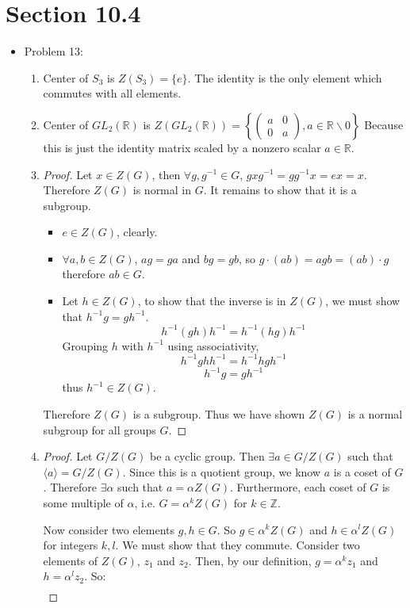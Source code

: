 \documentclass[a4paper,12pt]{extarticle}
\theoremstyle{definition}
\newcommand{\R}{\mathbb{R}} \newcommand{\Q}{\mathbb{Q}} \newcommand{\Z}{\mathbb{Z}} \newcommand{\N}{\mathbb{N}} \newcommand{\myskip}{\par\null\par} \renewcommand\qedsymbol{QED} \renewcommand{\leq}{\leqslant}\renewcommand{\geq}{\geqslant}
\begin{document}
\section{Section 10.4}
\begin{itemize}
    \item Problem 13:
    \begin{enumerate}[label=(\alph*)]
        \item Center of $S_3$ is $Z(S_3)=\{e\}$. The identity is the only element which commutes with all elements.
        \item Center of $GL_2(\R)$ is $Z(GL_2(\R))=\left\{\begin{pmatrix}
            a & 0 \\
            0 & a 
        \end{pmatrix},a\in\R\backslash 0\right\}$ Because this is just the identity matrix scaled by a nonzero scalar $a\in\R$.
        \item \begin{proof}
        Let $x\in Z(G)$, then $\forall g,g^{-1}\in G$, $gxg^{-1}=gg^{-1}x=ex=x$. Therefore $Z(G)$ is normal in $G$. It remains to show that it is a subgroup.\begin{itemize}
            \item $e\in Z(G)$, clearly.
            \item $\forall a,b\in Z(G)$, $ag=ga$ and $bg=gb$, so $g\cdot(ab)=agb=(ab)\cdot g$ therefore $ab\in G$.
            \item Let $h\in Z(G)$, to show that the inverse is in $Z(G)$, we must show that $h^{-1}g=gh^{-1}$. $$h^{-1}(gh)h^{-1}=h^{-1}(hg)h^{-1}$$ Grouping $h$ with $h^{-1}$ using associativity, $$h^{-1}ghh^{-1}=h^{-1}hgh^{-1}$$ $$h^{-1}g=gh^{-1}$$ thus $h^{-1}\in Z(G)$.
        \end{itemize} Therefore $Z(G)$ is a subgroup. Thus we have shown $Z(G)$ is a normal subgroup for all groups $G$.
        \end{proof}
        \item \begin{proof}
        Let $G\slash Z(G)$ be a cyclic group. Then $\exists a\in G\slash Z(G)$ such that $\langle a \rangle=G\slash Z(G)$. Since this is a quotient group, we know $a$ is a coset of $G$. Therefore $\exists \alpha$ such that $a=\alpha Z(G)$. Furthermore, each coset of $G$ is some multiple of $\alpha$, i.e. $G=\alpha^k Z(G)$ for $k\in\Z$.\myskip Now consider two elements $g,h\in G$. So $g\in\alpha^kZ(G)$ and $h\in\alpha^lZ(G)$ for integers $k,l$. We must show that they commute. Consider two elements of $Z(G)$, $z_1$ and $z_2$. Then, by our definition, $g=\alpha^kz_1$ and $h=\alpha^lz_2$. So:\begin{align*}

\end{align*}
\end{proof}
\end{enumerate}
\end{itemize}
\end{document}

